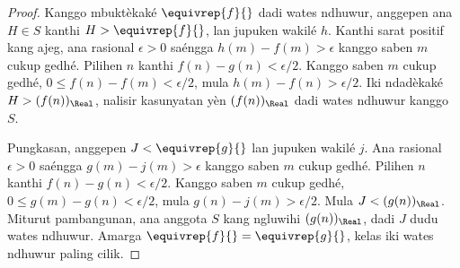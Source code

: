 \documentclass[../../../include/open-logic-section]{subfiles}
\begin{document}
\begin{proof}
Kanggo mbuktèkaké $\equivrep{f}{}$ dadi wates ndhuwur, anggepen
ana $H\in S$ kanthi $H>\equivrep{f}{}$, lan jupuken wakilé $h$.
Kanthi sarat positif kang ajeg, ana rasional $\epsilon>0$ saéngga
$h(m)-f(m)>\epsilon$ kanggo saben $m$ cukup gedhé. Pilihen $n$
kanthi $f(n)-g(n)<\epsilon/2$. Kanggo saben $m$ cukup gedhé,
$0\leq f(n)-f(m)<\epsilon/2$, mula $h(m)-f(n)>\epsilon/2$.
Iki ndadèkaké $H>(f(n))_\Real$, nalisir kasunyatan yèn
$(f(n))_\Real$ dadi wates ndhuwur kanggo $S$.

Pungkasan, anggepen $J<\equivrep{g}{}$ lan jupuken wakilé $j$.
Ana rasional $\epsilon>0$ saéngga $g(m)-j(m)>\epsilon$ kanggo saben
$m$ cukup gedhé. Pilihen $n$ kanthi $f(n)-g(n)<\epsilon/2$.
Kanggo saben $m$ cukup gedhé, $0\leq g(m)-g(n)<\epsilon/2$,
mula $g(n)-j(m)>\epsilon/2$. Mula $J<(g(n))_\Real$.
Miturut pambangunan, ana anggota $S$ kang ngluwihi $(g(n))_\Real$,
dadi $J$ dudu wates ndhuwur. Amarga $\equivrep{f}{}=\equivrep{g}{}$,
kelas iki wates ndhuwur paling cilik.
\end{proof}
\end{document}

